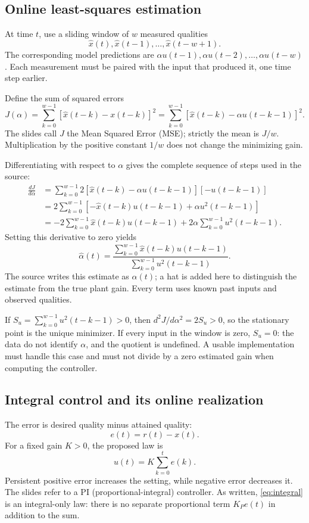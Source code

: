 \documentclass[11pt,a4paper]{article}
\numberwithin{equation}{section}
\numberwithin{figure}{section}
\numberwithin{table}{section}
\begin{document}
\subsection{Online least-squares estimation}
At time $t$, use a sliding window of $w$ measured qualities
\[\widehat{x}(t),\widehat{x}(t-1),\ldots,\widehat{x}(t-w+1).\]
The corresponding model predictions are $\alpha u(t-1),\alpha u(t-2),\ldots,\alpha u(t-w)$. Each measurement must be paired with the input that produced it, one time step earlier.

Define the sum of squared errors
\begin{equation}\label{eq:sse}
J(\alpha)=\sum_{k=0}^{w-1}[\widehat{x}(t-k)-x(t-k)]^2
=\sum_{k=0}^{w-1}[\widehat{x}(t-k)-\alpha u(t-k-1)]^2.
\end{equation}
The slides call $J$ the Mean Squared Error (MSE); strictly the mean is $J/w$. Multiplication by the positive constant $1/w$ does not change the minimizing gain.

Differentiating with respect to $\alpha$ gives the complete sequence of steps used in the source:
\begin{align*}
\frac{dJ}{d\alpha}
&=\sum_{k=0}^{w-1}2[\widehat{x}(t-k)-\alpha u(t-k-1)][-u(t-k-1)]\\
&=2\sum_{k=0}^{w-1}[-\widehat{x}(t-k)u(t-k-1)+\alpha u^2(t-k-1)]\\
&=-2\sum_{k=0}^{w-1}\widehat{x}(t-k)u(t-k-1)
+2\alpha\sum_{k=0}^{w-1}u^2(t-k-1).
\end{align*}
Setting this derivative to zero yields
\begin{equation}\label{eq:estimate}
\widehat\alpha(t)=\frac{\displaystyle\sum_{k=0}^{w-1}\widehat{x}(t-k)u(t-k-1)}{\displaystyle\sum_{k=0}^{w-1}u^2(t-k-1)}.
\end{equation}
The source writes this estimate as $\alpha(t)$; a hat is added here to distinguish the estimate from the true plant gain. Every term uses known past inputs and observed qualities.

If $S_u=\sum_{k=0}^{w-1}u^2(t-k-1)>0$, then $d^2J/d\alpha^2=2S_u>0$, so the stationary point is the unique minimizer. If every input in the window is zero, $S_u=0$: the data do not identify $\alpha$, and the quotient is undefined. A usable implementation must handle this case and must not divide by a zero estimated gain when computing the controller.

\subsection{Integral control and its online realization}
The error is desired quality minus attained quality:
\begin{equation}\label{eq:error}e(t)=r(t)-x(t).\end{equation}
For a fixed gain $K>0$, the proposed law is
\begin{equation}\label{eq:integral}u(t)=K\sum_{k=0}^{t}e(k).\end{equation}
Persistent positive error increases the setting, while negative error decreases it. The slides refer to a PI (proportional-integral) controller. As written, \cref{eq:integral} is an integral-only law: there is no separate proportional term $K_Pe(t)$ in addition to the sum.
\end{document}
